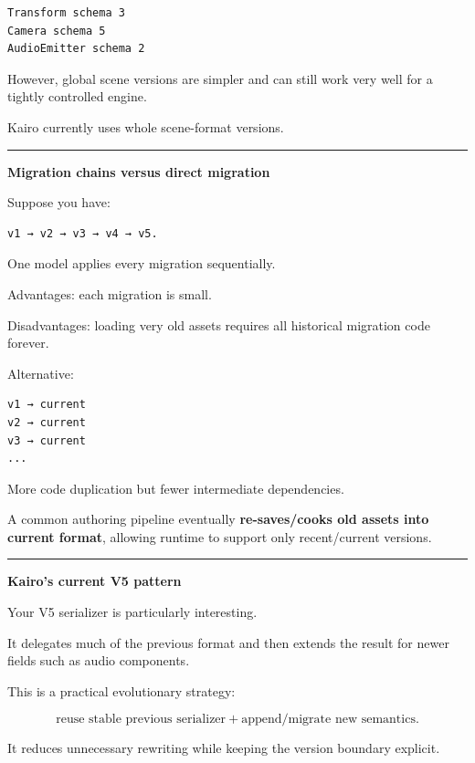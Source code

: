 \begin{verbatim}
Transform schema 3
Camera schema 5
AudioEmitter schema 2
\end{verbatim}

However, global scene versions are simpler and can still work very well for a tightly controlled engine.

Kairo currently uses whole scene-format versions.

\begin{center}\rule{0.5\linewidth}{0.5pt}\end{center}

\textbf{Migration chains versus direct migration}

Suppose you have:

\begin{verbatim}
v1 → v2 → v3 → v4 → v5.
\end{verbatim}

One model applies every migration sequentially.

Advantages: each migration is small.

Disadvantages: loading very old assets requires all historical migration code forever.

Alternative:

\begin{verbatim}
v1 → current
v2 → current
v3 → current
...
\end{verbatim}

More code duplication but fewer intermediate dependencies.

A common authoring pipeline eventually \textbf{re-saves/cooks old assets into current format}, allowing runtime to support only recent/current versions.

\begin{center}\rule{0.5\linewidth}{0.5pt}\end{center}

\textbf{Kairo's current V5 pattern}

Your V5 serializer is particularly interesting.

It delegates much of the previous format and then extends the result for newer fields such as audio components.

This is a practical evolutionary strategy:

\[
\text{reuse stable previous serializer}
+
\text{append/migrate new semantics}.
\]

It reduces unnecessary rewriting while keeping the version boundary explicit.

